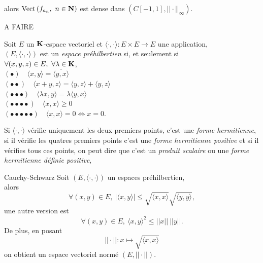 \documentclass[a4paper,11pt, twoside]{article}
\begin{document}
alors $\mathrm{Vect}\left(f_{a_n},\ n\in\N\right)$ est dense dans $\left(C[-1,1],||\cdot||_\infty\right)$.


\begin{Proof}
  A FAIRE
\end{Proof}


\setcounter{prop}{0}






\begin{Def}
  Soit $E$ un $\mathbf K$-espace vectoriel et $\langle \cdot,\cdot\rangle:E\times E\longrightarrow E$ une application,\\

  $(E,\langle \cdot,\cdot\rangle)$ est un \emph{espace préhilbertien} si, et seulement si \\
  $\forall (x,y,z)\in E,\ \forall \lambda\in\mathbf K$,\\
  $(\bullet)\quad \langle x,y\rangle =\overline{\langle y,x\rangle}$\\
  $(\bullet\bullet)\quad \langle x+y,z\rangle =\langle y,z\rangle+\langle y,z\rangle$\\
  $(\bullet\bullet\bullet)\quad \langle \lambda x,y\rangle =\lambda\langle y,x\rangle$\\
  $(\bullet\bullet\bullet\bullet)\quad \langle x,x\rangle \geqslant 0$\\
  $(\bullet\bullet\bullet\bullet\bullet)\quad \langle x,x\rangle = 0\Leftrightarrow x=0.$\\
\end{Def}


\begin{RQ}
  Si $\langle \cdot,\cdot\rangle$ vérifie uniquement les deux premiers points, c'est une \emph{forme hermitienne}, si il vérifie les quatres premiers points c'est une \emph{forme hermitienne positive} et si il vérifies tous ces points, on peut dire que c'est un \emph{produit scalaire} ou une \emph{forme hermitienne définie positive}, 
\end{RQ}


\begin{propC}{Cauchy-Schwarz}
  Soit $(E,\langle \cdot,\cdot\rangle)$ un espaces préhilbertien,\\

  alors 
  $$\forall (x,y)\in E,\ |\langle x,y\rangle|\leqslant \sqrt{\langle x,x\rangle}\sqrt{\langle y,y\rangle},$$
  une autre version est 
  $$\forall (x,y)\in E,\ \langle x,y\rangle^2\leqslant ||x||\ ||y||.$$
  De plus, en posant 
  $$||\cdot||:x\longmapsto \sqrt{\langle x,x\rangle}$$
  on obtient un espace vectoriel normé $(E,||\cdot||)$.
\end{propC}
\end{document}
